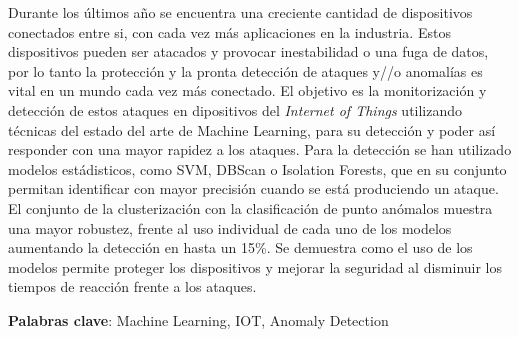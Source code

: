Durante los últimos año se encuentra una creciente cantidad de dispositivos conectados entre si, con cada vez más aplicaciones en la industria. Estos dispositivos pueden ser atacados y provocar inestabilidad o una fuga de datos, por lo tanto la protección y la pronta detección de ataques y//o anomalías es vital en un mundo cada vez más conectado. El objetivo es la monitorización y detección de estos ataques en dipositivos del \textit{Internet of Things} utilizando técnicas del estado del arte de Machine Learning, para su detección y poder así responder con una mayor rapidez a los ataques. Para la detección se han utilizado modelos estádisticos, como SVM, DBScan o Isolation Forests, que en su conjunto permitan identificar con mayor precisión cuando se está produciendo un ataque. El conjunto de la clusterización con la clasificación de punto anómalos muestra una mayor robustez, frente al uso individual de cada uno de los modelos aumentando la detección en hasta un 15\%. Se demuestra como el uso de los modelos permite proteger los dispositivos y mejorar la seguridad al disminuir los tiempos de reacción frente a los ataques.

\vspace{0.5cm}
\textbf{Palabras clave}: Machine Learning, IOT, Anomaly Detection